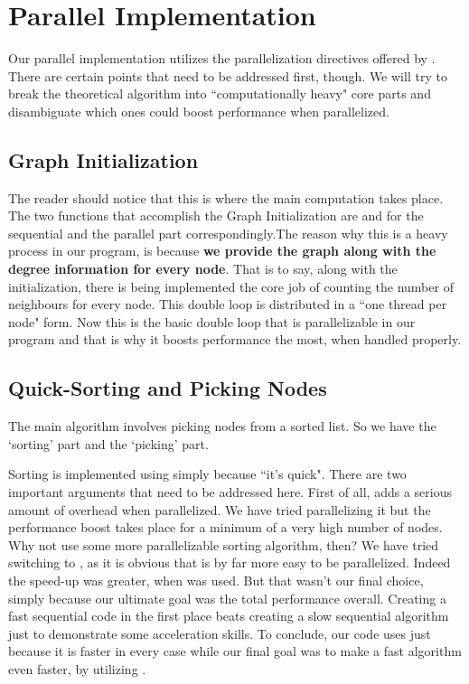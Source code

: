 \section{Parallel Implementation}
Our parallel implementation utilizes the parallelization directives offered by . There are certain points that need to be addressed first, though. We will try to break the theoretical algorithm into ``computationally heavy" core parts and disambiguate which ones could boost performance when parallelized.

\bigbreak 

\subsection{Graph Initialization}
The reader should notice that this is where the main computation takes place. The two functions that accomplish the Graph Initialization are  and  for the sequential and the parallel part correspondingly.The reason why this is a heavy process in our program, is because \textbf{we provide the graph along with the degree information for every node}. That is to say, along with the initialization, there is being implemented the core job of counting the number of neighbours for every node. This double loop is distributed in a ``one thread per node" form. Now this is the basic double loop that is parallelizable in our program and that is why it boosts performance the most, when handled properly.
\bigbreak 

\subsection{Quick-Sorting and Picking Nodes}
The main algorithm involves picking nodes from a sorted list. So we have the `sorting' part and the `picking' part. 

Sorting is implemented using  simply because ``it's quick". There are two important arguments that need to be addressed here. First of all,  adds a serious amount of overhead when parallelized. We have tried parallelizing it but the performance boost takes place for a minimum of a very high number of nodes. Why not use some more parallelizable sorting algorithm, then? We have tried switching to , as it is obvious that is by far more easy to be parallelized. Indeed the speed-up  was greater, when  was used. But that wasn't our final choice, simply because our ultimate goal was the total performance overall. Creating a fast sequential code in the first place beats creating a slow sequential algorithm just to demonstrate some acceleration skills. To conclude, our code uses  just because it is faster in every case while our final goal was to make a fast algorithm even faster, by utilizing . 

